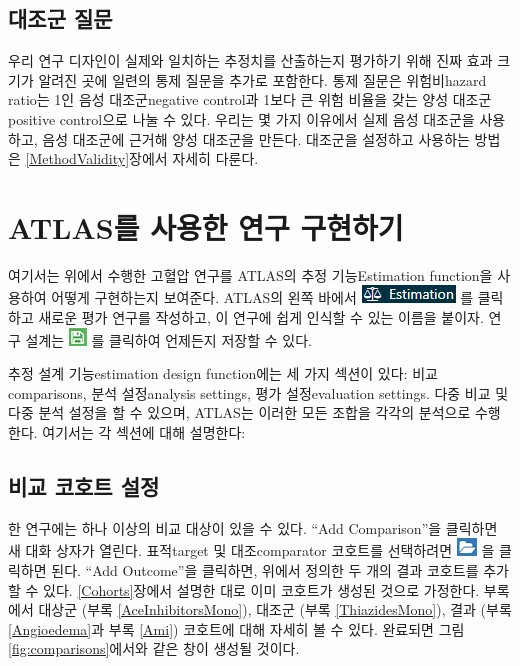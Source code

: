 \documentclass[10.5pt]{book}
\theoremstyle{definition}
\theoremstyle{definition}
\theoremstyle{definition}
\theoremstyle{remark}
\begin{document}
\subsection{대조군 질문}\label{-}

우리 연구 디자인이 실제와 일치하는 추정치를 산출하는지 평가하기 위해
진짜 효과 크기가 알려진 곳에 일련의 통제 질문을 추가로 포함한다. 통제
질문은 위험비hazard ratio는 1인 음성 대조군negative control과 1보다 큰
위험 비율을 갖는 양성 대조군positive control으로 나눌 수 있다. 우리는 몇
가지 이유에서 실제 음성 대조군을 사용하고, 음성 대조군에 근거해 양성
대조군을 만든다. 대조군을 설정하고 사용하는 방법은
\ref{MethodValidity}장에서 자세히 다룬다.

\section{ATLAS를 사용한 연구 구현하기}\label{PleAtlas}

여기서는 위에서 수행한 고혈압 연구를 ATLAS의 추정 기능Estimation
function을 사용하여 어떻게 구현하는지 보여준다. ATLAS의 왼쪽 바에서
\includegraphics{images/PopulationLevelEstimation/estimation.png} 를
클릭하고 새로운 평가 연구를 작성하고, 이 연구에 쉽게 인식할 수 있는
이름을 붙이자. 연구 설계는
\includegraphics{images/PopulationLevelEstimation/save.png} 를 클릭하여
언제든지 저장할 수 있다.

추정 설계 기능estimation design function에는 세 가지 섹션이 있다:
비교comparisons, 분석 설정analysis settings, 평가 설정evaluation
settings. 다중 비교 및 다중 분석 설정을 할 수 있으며, ATLAS는 이러한
모든 조합을 각각의 분석으로 수행한다. 여기서는 각 섹션에 대해 설명한다:

\subsection{비교 코호트 설정}\label{ComparisonSettings}

한 연구에는 하나 이상의 비교 대상이 있을 수 있다. ``Add Comparison''을
클릭하면 새 대화 상자가 열린다. 표적target 및 대조comparator 코호트를
선택하려면 \includegraphics{images/PopulationLevelEstimation/open.png}
을 클릭하면 된다. ``Add Outcome''을 클릭하면, 위에서 정의한 두 개의 결과
코호트를 추가할 수 있다. \ref{Cohorts}장에서 설명한 대로 이미 코호트가
생성된 것으로 가정한다. 부록에서 대상군 (부록 \ref{AceInhibitorsMono}),
대조군 (부록 \ref{ThiazidesMono}), 결과 (부록 \ref{Angioedema}과 부록
\ref{Ami}) 코호트에 대해 자세히 볼 수 있다. 완료되면 그림
\ref{fig:comparisons}에서와 같은 창이 생성될 것이다.
\end{document}
